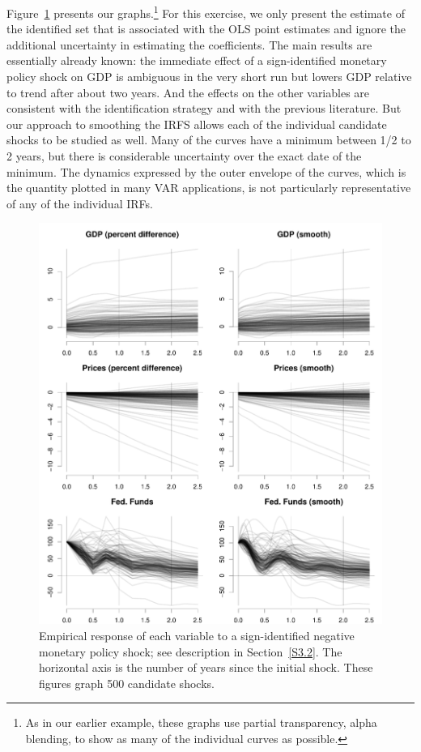 \documentclass[AER,reviewmode]{tex/AEA}
\begin{document}
Figure~\ref{fig:5} presents our graphs.\footnote{%
  As in our earlier example, these graphs use partial transparency,
  alpha blending, to show as many of the individual curves as
  possible.} %
For this exercise, we only present the estimate of the identified set
that is associated with the OLS point estimates and ignore the
additional uncertainty in estimating the coefficients. The main
results are essentially already known: the immediate effect of a
sign-identified monetary policy shock on GDP is ambiguous in the very
short run but lowers GDP relative to trend after about two years. And
the effects on the other variables are consistent with the
identification strategy and with the previous literature. But our
approach to smoothing the IRFS allows each of the individual candidate
shocks to be studied as well. Many of the curves have a minimum
between 1/2 to 2 years, but there is considerable uncertainty over the
exact date of the minimum.  The dynamics expressed by the outer
envelope of the curves, which is the quantity plotted in many VAR
applications, is not particularly representative of any of the
individual IRFs.

\newcommand{\graphwidth}{3.95in}
\begin{figure}[t]
  \centering
  \includegraphics[width=5.5in]{graphs/empirics}
  \caption{%
    Empirical response of each variable to a sign-identified negative
    monetary policy shock; see description in Section~\ref{S3.2}. The
    horizontal axis is the number of years since the initial
    shock. These figures graph 500 candidate shocks.}
  \label{fig:5}
\end{figure}
\end{document}
